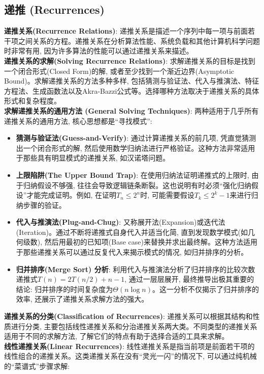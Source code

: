 \documentclass[12pt, a4paper, UTF8]{ctexart}
\newcommand{\term}[1]{\textbf{\textcolor{blue!80!black}{#1}}}
\newcommand{\emphb}[1]{\textbf{#1}}
\begin{document}
\begin{sloppypar}
    \subsection{递推 (Recurrences)}
    \term{递推关系(Recurrence Relations)}: 递推关系是描述一个序列中每一项与前面若干项之间关系的方程。递推关系在分析算法性能、系统负载和其他计算机科学问题时非常有用, 因为许多算法的性能可以通过递推关系来描述。\\
    \term{递推关系的求解(Solving Recurrence Relations)}: 求解递推关系的目标是找到一个闭合形式(Closed Form)的解, 或者至少找到一个渐近边界(Asymptotic Bound)。求解递推关系的方法多种多样, 包括猜测与验证法、代入与推演法、特征方程法、生成函数法以及Akra-Bazzi公式等。选择哪种方法取决于递推关系的具体形式和复杂程度。\\
    \emphb{求解递推关系的通用方法 (General Solving Techniques)}: 两种适用于几乎所有递推关系的通用方法, 核心思想都是“寻找模式”:
    \begin{itemize}[nosep]
        \item \emphb{猜测与验证法(Guess-and-Verify)}: 通过计算递推关系的前几项, 凭直觉猜测出一个闭合形式的解, 然后使用数学归纳法进行严格验证。这种方法非常适用于那些具有明显模式的递推关系, 如汉诺塔问题。
        \item \emphb{上限陷阱(The Upper Bound Trap)}: 在使用归纳法证明递推式的上限时, 由于归纳假设不够强, 往往会导致逻辑链条断裂。这也说明有时必须“强化归纳假设”才能完成证明。例如, 在证明$T_n \leq 2^n$时, 可能需要假设$T_k \leq 2^k - 1$来进行归纳步骤的验证。
        \item \emphb{代入与推演法(Plug-and-Chug)}: 又称展开法(Expansion)或迭代法(Iteration)。通过不断将递推式自身代入并适当化简, 直到发现数学模式(如几何级数), 然后用最初的已知项(Base case)来替换并求出最终解。这种方法适用于那些递推关系可以通过反复代入来揭示模式的情况, 如归并排序的分析。
        \item \emphb{归并排序(Merge Sort) 分析}: 利用代入与推演法分析了归并排序的比较次数递推式$T(n) = 2T(n/2) + n - 1$, 通过一层层展开, 最终推导出极其重要的结论: 归并排序的时间复杂度为$\Theta(n \log n)$。这一分析不仅揭示了归并排序的效率, 还展示了递推关系求解方法的强大。
    \end{itemize}
    \emphb{递推关系的分类(Classification of Recurrences)}: 递推关系可以根据其结构和性质进行分类, 主要包括线性递推关系和分治递推关系两大类。不同类型的递推关系适用于不同的求解方法, 了解它们的特点有助于选择合适的工具来求解。\\
    \term{线性递推关系(Linear Recurrences)}: 线性递推关系是指当前项是前面若干项的线性组合的递推关系。这类递推关系在没有“灵光一闪”的情况下, 可以通过纯机械的“菜谱式”步骤求解:

\end{sloppypar}
\end{document}
